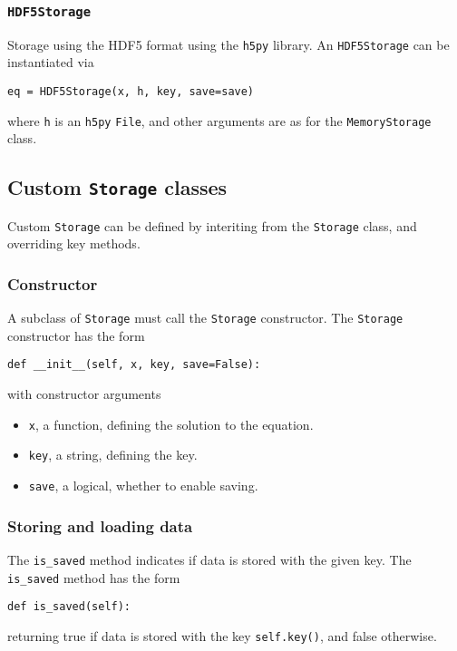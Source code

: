 \documentclass[11pt]{article}
\begin{document}
\subsubsection{\texttt{HDF5Storage}}

Storage using the HDF5 format \citep{hdf52021} using the \texttt{h5py} library.
An \texttt{HDF5Storage} can be instantiated via
\begin{lstlisting}
eq = HDF5Storage(x, h, key, save=save)
\end{lstlisting}
where \texttt{h} is an \texttt{h5py} \texttt{File}, and other arguments are as
for the \texttt{MemoryStorage} class.

\subsection{Custom \texttt{Storage} classes}

Custom \texttt{Storage} can be defined by interiting from the \texttt{Storage}
class, and overriding key methods.

\subsubsection{Constructor}

A subclass of \texttt{Storage} must call the \texttt{Storage} constructor. The
\texttt{Storage} constructor has the form
\begin{lstlisting}
def __init__(self, x, key, save=False):
\end{lstlisting}
with constructor arguments
\begin{itemize}
  \item \texttt{x}, a function, defining the solution to the equation.
  \item \texttt{key}, a string, defining the key.
  \item \texttt{save}, a logical, whether to enable saving.
\end{itemize}

\subsubsection{Storing and loading data}

The \texttt{is\_saved} method indicates if data is stored with the given key.
The \texttt{is\_saved} method has the form
\begin{lstlisting}
def is_saved(self):
\end{lstlisting}
returning true if data is stored with the key \texttt{self.key()}, and false
otherwise.
\end{document}
